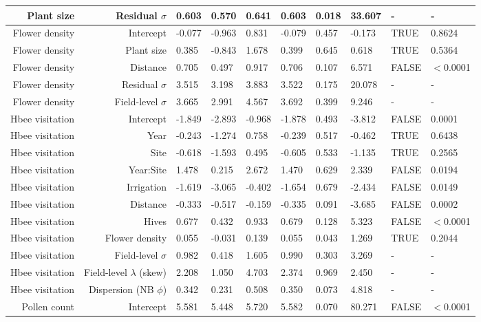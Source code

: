 \begin{landscape}
\begin{longtable}{|r|r|l|l|l|l|l|l|l|l|}
  Plant size & Residual $\sigma$ & 0.603 & 0.570 & 0.641 & 0.603 & 0.018 & 33.607 & - & - \\ 
  \hline %
  Flower density & Intercept & -0.077 & -0.963 & 0.831 & -0.079 & 0.457 & -0.173 & TRUE & 0.8624 \\ 
  Flower density & Plant size & 0.385 & -0.843 & 1.678 & 0.399 & 0.645 & 0.618 & TRUE & 0.5364 \\ 
  Flower density & Distance & 0.705 & 0.497 & 0.917 & 0.706 & 0.107 & 6.571 & FALSE & $<$0.0001 \\ 
  Flower density & Residual $\sigma$ & 3.515 & 3.198 & 3.883 & 3.522 & 0.175 & 20.078 & - & - \\ 
  Flower density & Field-level $\sigma$ & 3.665 & 2.991 & 4.567 & 3.692 & 0.399 & 9.246 & - & - \\ 
  \hline %
  Hbee visitation & Intercept & -1.849 & -2.893 & -0.968 & -1.878 & 0.493 & -3.812 & FALSE & 0.0001 \\ 
  Hbee visitation & Year & -0.243 & -1.274 & 0.758 & -0.239 & 0.517 & -0.462 & TRUE & 0.6438 \\ 
  Hbee visitation & Site & -0.618 & -1.593 & 0.495 & -0.605 & 0.533 & -1.135 & TRUE & 0.2565 \\ 
  Hbee visitation & Year:Site & 1.478 & 0.215 & 2.672 & 1.470 & 0.629 & 2.339 & FALSE & 0.0194 \\ 
  Hbee visitation & Irrigation & -1.619 & -3.065 & -0.402 & -1.654 & 0.679 & -2.434 & FALSE & 0.0149 \\ 
  Hbee visitation & Distance & -0.333 & -0.517 & -0.159 & -0.335 & 0.091 & -3.685 & FALSE & 0.0002 \\ 
  Hbee visitation & Hives & 0.677 & 0.432 & 0.933 & 0.679 & 0.128 & 5.323 & FALSE & $<$0.0001 \\ 
  Hbee visitation & Flower density & 0.055 & -0.031 & 0.139 & 0.055 & 0.043 & 1.269 & TRUE & 0.2044 \\ 
  Hbee visitation & Field-level $\sigma$ & 0.982 & 0.418 & 1.605 & 0.990 & 0.303 & 3.269 & - & - \\ 
  Hbee visitation & Field-level $\lambda$ (skew) & 2.208 & 1.050 & 4.703 & 2.374 & 0.969 & 2.450 & - & - \\ 
  Hbee visitation & Dispersion (NB $\phi$) & 0.342 & 0.231 & 0.508 & 0.350 & 0.073 & 4.818 & - & - \\ 
  \hline %
  Pollen count & Intercept & 5.581 & 5.448 & 5.720 & 5.582 & 0.070 & 80.271 & FALSE & $<$0.0001 \\ 

\end{longtable}
\end{landscape}

